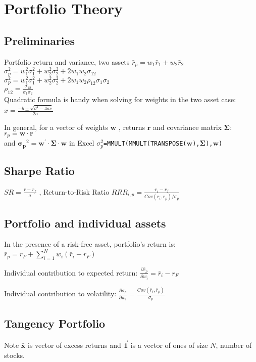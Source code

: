 \section{Portfolio Theory}

\subsection*{Preliminaries}

Portfolio return and variance, two assets
$ \bar{r}_p = w_1 \bar{r}_1 +  w_2 \bar{r}_2 $ \\
$ \sigma_p^2 = w_1^2 \sigma_1^2 + w_2^2 \sigma_2^2 + 2 w_1 w_2 \sigma_{12}  $ \\
$ \sigma_p^2 = w_1^2 \sigma_1^2 + w_2^2 \sigma_2^2 + 2 w_1 w_2 \rho_{12} \sigma_1 \sigma_2  $ \\		
$  \rho_{12} = \frac{\sigma_{12}}{\sigma_1 \sigma_2}$ \\

Quadratic formula is handy when solving for weights in the two asset case:
$x=\frac{-b\pm\sqrt{b^2-4ac}}{2a}$

In general, for a vector of weights $\bm{w}$ , returns $\bm{r}$ and covariance matrix $\bm{\Sigma}$:
$ r_p = \bm{w} \cdotp \bm{r} $ \\ 	and $\bm{ \sigma_p}^2 = \bm{w}^\prime \cdot \bm{\Sigma} \cdot \bm{w} $
in Excel  \texttt{$\sigma_p^2$=MMULT(MMULT(TRANSPOSE($\bm{w}$),$\bm{\Sigma}$),$\bm{w}$)  }


\subsection*{Sharpe Ratio}
$SR = \frac{r-r_f}{\sigma}$ , 
Return-to-Risk Ratio $RRR_{i,p} = \frac{r_i-r_f}{Cov(r_i,r_p)/\sigma_p}$

\subsection*{Portfolio and individual assets}
In the presence of a risk-free asset, portfolio’s return is: $\bar{r}_p =r_F + \sum_{i=1}^{N} w_i (\bar{r}_i -r_F)$

{Individual contribution to expected return:}
$ \frac{\partial \bar{r}_p}{\partial w_i}  = \bar{r}_i - r_F$

{Individual contribution to volatility:}
$ \frac{\partial \sigma_p}{\partial w_i}  = \frac{Cov(\bar{r}_i,\bar{r}_p )}{\sigma_p}$

\subsection*{Tangency Portfolio}
Note $\bm{\bar{x}}$ is vector of excess returns and $\bm{\vec{1}}$ is a vector of ones of size $N$, number of stocks.


